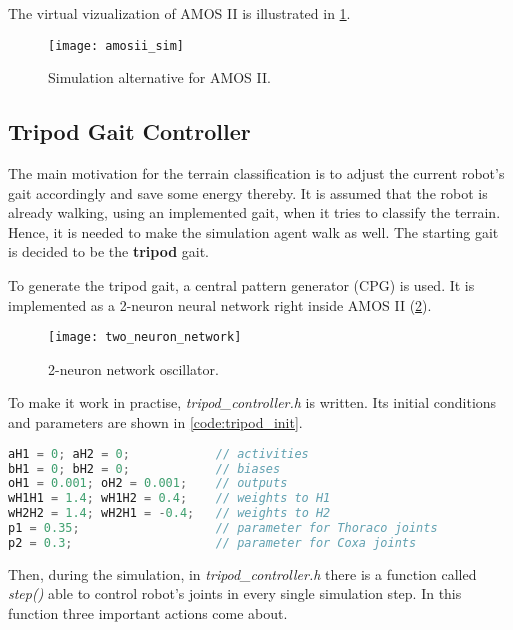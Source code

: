 The virtual vizualization of AMOS II is illustrated in \cref{img:amosii_sim}.

\begin{figure}[H]
  \centering
  \texttt{[image: amosii\_sim]}
  \caption{Simulation alternative for AMOS II.}
  \label{img:amosii_sim}
\end{figure}

\subsection{Tripod Gait Controller} \label{ssec:tripod_gait_controller}
The main motivation for the terrain classification is to adjust the current robot's gait accordingly and save some energy thereby. It is assumed that the robot is already walking, using an implemented gait, when it tries to classify the terrain. Hence, it is needed to make the simulation agent walk as well. The starting gait is decided to be the \textbf{tripod} gait.

To generate the tripod gait, a central pattern generator (CPG) is used. \citep{unpub:ai3_lec3} It is implemented as a 2-neuron neural network right inside AMOS II (\cref{img:two_neuron_network}).

\begin{figure}[H]
  \centering
  \texttt{[image: two\_neuron\_network]}
  \caption{2-neuron network oscillator. \citep{unpub:ai3_lec3}}
  \label{img:two_neuron_network}
\end{figure}

To make it work in practise, \textit{tripod\_controller.h} is written. Its initial conditions and parameters are shown in \cref{code:tripod_init}.

\begin{lstlisting}[language=C++, caption={Initialization in tripod\_controller.h}, label=code:tripod_init]
aH1 = 0; aH2 = 0;            // activities
bH1 = 0; bH2 = 0;            // biases
oH1 = 0.001; oH2 = 0.001;    // outputs
wH1H1 = 1.4; wH1H2 = 0.4;    // weights to H1
wH2H2 = 1.4; wH2H1 = -0.4;   // weights to H2
p1 = 0.35;                   // parameter for Thoraco joints
p2 = 0.3;                    // parameter for Coxa joints
\end{lstlisting}

Then, during the simulation, in \textit{tripod\_controller.h} there is a function called \textit{step()} able to control robot's joints in every single simulation step. In this function three important actions come about.

